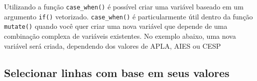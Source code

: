 \documentclass[
]{book}
\newenvironment{Shaded}{\begin{snugshade}}{\end{snugshade}}
\newcommand{\CommentTok}[1]{\textcolor[rgb]{0.56,0.35,0.01}{\textit{#1}}}
\newcommand{\DataTypeTok}[1]{\textcolor[rgb]{0.13,0.29,0.53}{#1}}
\newcommand{\DecValTok}[1]{\textcolor[rgb]{0.00,0.00,0.81}{#1}}
\newcommand{\FloatTok}[1]{\textcolor[rgb]{0.00,0.00,0.81}{#1}}
\newcommand{\KeywordTok}[1]{\textcolor[rgb]{0.13,0.29,0.53}{\textbf{#1}}}
\newcommand{\NormalTok}[1]{#1}
\newcommand{\OperatorTok}[1]{\textcolor[rgb]{0.81,0.36,0.00}{\textbf{#1}}}
\newcommand{\OtherTok}[1]{\textcolor[rgb]{0.56,0.35,0.01}{#1}}
\newcommand{\StringTok}[1]{\textcolor[rgb]{0.31,0.60,0.02}{#1}}
\begin{document}
Utilizando a função \texttt{case\_when()}  é possível criar uma variável baseado em um argumento \texttt{if()} vetorizado. \texttt{case\_when()} é particularmente útil dentro da função \texttt{mutate()} quando você quer criar uma nova variável que depende de uma combinação complexa de variáveis existentes. No exemplo abaixo, uma nova variável será criada, dependendo dos valores de APLA, AIES ou CESP

\begin{Shaded}
\end{Shaded}

\hypertarget{selecionar-linhas-com-base-em-seus-valores}{%
\subsection{Selecionar linhas com base em seus valores}\label{selecionar-linhas-com-base-em-seus-valores}}
\end{document}

